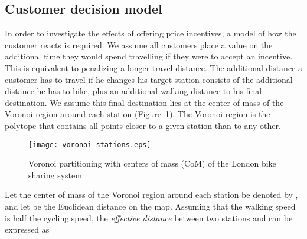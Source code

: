 \documentclass{article}
\begin{document}
\subsection{Customer decision model}
\label{sec:cust-react-incent}
In order to investigate the effects of offering price incentives, a model of how
the customer reacts is required. We assume all customers place a value on the
additional time they would spend travelling if they were to accept an incentive.
This is equivalent to penalizing a longer travel distance. The additional
distance a customer has to travel if he changes his target station consists of
the additional distance he has to bike, plus an additional walking distance to
his final destination. We assume this final destination lies at the center of
mass of the Voronoi region around each station
(Figure~\ref{fig:voronoi-system}). The Voronoi region is the polytope that contains
all points closer to a given station than to any other.
\begin{figure}[ht]
    \centering
    \texttt{[image: voronoi-stations.eps]}
    \caption{Voronoi partitioning with centers of mass (CoM) of the
      London bike sharing system}
    \label{fig:voronoi-system}
\end{figure}

Let the center of mass of the Voronoi region around each station  be denoted
by , and let  be the Euclidean distance on the map.
Assuming that the walking speed is half the cycling speed, the \emph{effective
  distance}  between two stations  and  can be
expressed as
\end{document}
